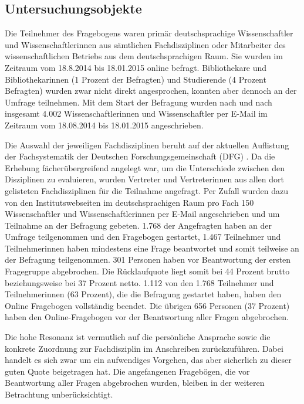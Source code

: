 \subsection{Untersuchungsobjekte}

Die Teilnehmer des Fragebogens waren primär deutschsprachige Wissenschaftler und Wissenschaftlerinnen aus sämtlichen Fachdisziplinen oder Mitarbeiter des wissenschaftlichen Betriebs aus dem deutschsprachigen Raum. Sie wurden im Zeitraum vom 18.8.2014 bis 18.01.2015 online befragt. Bibliothekare und Bibliothekarinnen (1 Prozent der Befragten) und Studierende (4 Prozent Befragten) wurden zwar nicht direkt angesprochen, konnten aber dennoch an der Umfrage teilnehmen. Mit dem Start der Befragung wurden nach und nach insgesamt 4.002 Wissenschaftlerinnen und Wissenschaftler per E-Mail im Zeitraum vom 18.08.2014 bis 18.01.2015 angeschrieben.

Die Auswahl der jeweiligen Fachdisziplinen beruht auf der aktuellen Auflistung der Fachsystematik der Deutschen Forschungsgemeinschaft (DFG) \cite{suchen_Webseite_DFG}. Da die Erhebung fächerübergreifend angelegt war, um die Unterschiede zwischen den Disziplinen zu evaluieren, wurden Vertreter und Vertreterinnen aus allen dort gelisteten Fachdisziplinen für die Teilnahme angefragt. Per Zufall wurden dazu von den Institutswebseiten im deutschsprachigen Raum pro Fach 150 Wissenschaftler und Wissenschaftlerinnen per E-Mail angeschrieben und um Teilnahme an der Befragung gebeten. 1.768 der Angefragten haben an der Umfrage teilgenommen und den Fragebogen gestartet, 1.467 Teilnehmer und Teilnehmerinnen haben mindestens eine Frage beantwortet und somit teilweise an der Befragung teilgenommen. 301 Personen haben vor Beantwortung der ersten Fragegruppe abgebrochen. Die Rücklaufquote liegt somit bei 44 Prozent brutto beziehungsweise bei 37 Prozent netto. 1.112 von den 1.768 Teilnehmer und Teilnehmerinnen (63 Prozent), die die Befragung gestartet haben, haben den Online Fragebogen vollständig beendet. Die übrigen 656 Personen (37 Prozent) haben den Online-Fragebogen vor der Beantwortung aller Fragen abgebrochen.

Die hohe Resonanz ist vermutlich auf die persönliche Ansprache sowie die konkrete Zuordnung zur Fachdisziplin im Anschreiben zurückzuführen. Dabei handelt es sich zwar um ein aufwendiges Vorgehen, das aber sicherlich zu dieser guten Quote beigetragen hat. Die angefangenen Fragebögen, die vor Beantwortung aller Fragen abgebrochen wurden, bleiben in der weiteren Betrachtung unberücksichtigt.

